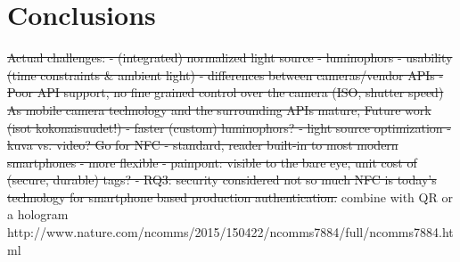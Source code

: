 \documentclass[thesis.tex]{subfiles}
\begin{document}
\chapter{Conclusions}
\label{chapter:conclusions}

\sout{Actual challenges:
- (integrated) normalized light source
- luminophors
- usability (time constraints \& ambient light)
- differences between cameras/vendor APIs
- Poor API support, no fine grained control over the camera (ISO, shutter speed)
As mobile camera technology and the surrounding APIs mature,
Future work (isot kokonaisuudet!)
  - faster (custom) luminophors?
  - light source optimization
  - kuva vs. video?
Go for NFC
- standard, reader built-in to most modern smartphones
- more flexible
- painpont: visible to the bare eye, unit cost of (secure, durable) tags?
- RQ3: security considered not so much
NFC is today's technology for smartphone based production authentication.}
combine with QR or a hologram
http://www.nature.com/ncomms/2015/150422/ncomms7884/full/ncomms7884.html
\end{document}
